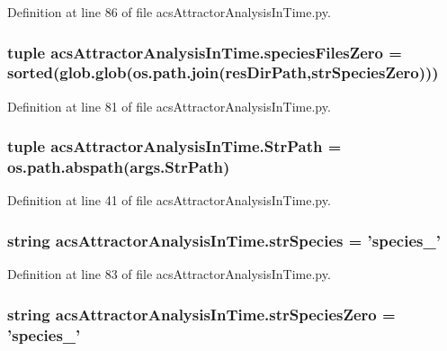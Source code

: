 Definition at line 86 of file acs\+Attractor\+Analysis\+In\+Time.\+py.

\hypertarget{a00125_a4657fd3a80cf1c76ab075d62d8de3bf3}{
\subsubsection[{species\+Files\+Zero}]{\setlength{\rightskip}{0pt plus 5cm}tuple acs\+Attractor\+Analysis\+In\+Time.\+species\+Files\+Zero = sorted(glob.\+glob(os.\+path.\+join({\bf res\+Dir\+Path},{\bf str\+Species\+Zero})))}}\label{a00125_a4657fd3a80cf1c76ab075d62d8de3bf3}


Definition at line 81 of file acs\+Attractor\+Analysis\+In\+Time.\+py.

\hypertarget{a00125_a1d168f4d444ea1d02f186a7568344fba}{
\subsubsection[{Str\+Path}]{\setlength{\rightskip}{0pt plus 5cm}tuple acs\+Attractor\+Analysis\+In\+Time.\+Str\+Path = os.\+path.\+abspath(args.\+Str\+Path)}}\label{a00125_a1d168f4d444ea1d02f186a7568344fba}


Definition at line 41 of file acs\+Attractor\+Analysis\+In\+Time.\+py.

\hypertarget{a00125_ac1f05e7db61bcc83ea1ed27460462202}{
\subsubsection[{str\+Species}]{\setlength{\rightskip}{0pt plus 5cm}string acs\+Attractor\+Analysis\+In\+Time.\+str\+Species = 'species\+\_\+'}}\label{a00125_ac1f05e7db61bcc83ea1ed27460462202}


Definition at line 83 of file acs\+Attractor\+Analysis\+In\+Time.\+py.

\hypertarget{a00125_aea2d717887265b294c623099d2495d4f}{
\subsubsection[{str\+Species\+Zero}]{\setlength{\rightskip}{0pt plus 5cm}string acs\+Attractor\+Analysis\+In\+Time.\+str\+Species\+Zero = 'species\+\_\+'}}\label{a00125_aea2d717887265b294c623099d2495d4f}


